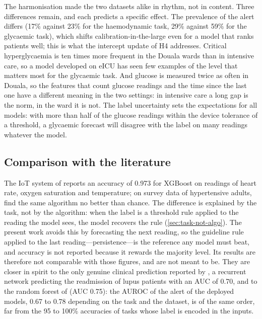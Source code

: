 \documentclass[11pt,a4paper,oneside]{report}
\makeatletter
\renewcommand\paragraph{\@startsection{paragraph}{4}{\z@}{1.5ex \@plus 0.5ex \@minus 0.2ex}{-1em}{\normalfont\normalsize\bfseries}}
\makeatother
\begin{document}
The harmonisation made the two datasets alike in rhythm, not in content. Three differences remain, and each predicts a specific effect. The prevalence of the alert differs (17\% against 23\% for the haemodynamic task, 29\% against 59\% for the glycaemic task), which shifts calibration-in-the-large even for a model that ranks patients well; this is what the intercept update of H4 addresses. Critical hyperglycaemia is ten times more frequent in the Douala wards than in intensive care, so a model developed on eICU has seen few examples of the level that matters most for the glycaemic task. And glucose is measured twice as often in Douala, so the features that count glucose readings and the time since the last one have a different meaning in the two settings: in intensive care a long gap is the norm, in the ward it is not. The label uncertainty sets the expectations for all models: with more than half of the glucose readings within the device tolerance of a threshold, a glycaemic forecast will disagree with the label on many readings whatever the model.

\subsection{Comparison with the literature}

\paragraph{Predictive performance.} The IoT system of \textcite{efendi2025} reports an accuracy of 0.973 for XGBoost on readings of heart rate, oxygen saturation and temperature; on survey data of hypertensive adults, \textcite{mendoza2025} find the same algorithm no better than chance. The difference is explained by the task, not by the algorithm: when the label is a threshold rule applied to the reading the model sees, the model recovers the rule (\cref{sec:task-not-algo}). The present work avoids this by forecasting the next reading, so the guideline rule applied to the last reading---persistence---is the reference any model must beat, and accuracy is not reported because it rewards the majority level. Its results are therefore not comparable with those figures, and are not meant to be. They are closer in spirit to the only genuine clinical prediction reported by \textcite{liu2025review}, a recurrent network predicting the readmission of lupus patients with an AUC of 0.70, and to the random forest of \textcite{mendoza2025} (AUC 0.75): the AUROC of the alert of the deployed models, 0.67 to 0.78 depending on the task and the dataset, is of the same order, far from the 95 to 100\% accuracies of tasks whose label is encoded in the inputs.
\end{document}

